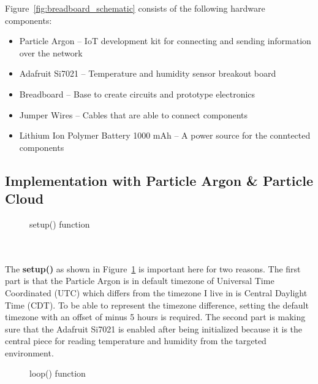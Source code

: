 \documentclass{article}
\begin{document}
Figure~\ref{fig:breadboard_schematic} consists of the following hardware components:

\begin{itemize}
	\item Particle Argon -- IoT development kit for connecting and sending information over the network
	\item Adafruit Si7021 -- Temperature and humidity sensor breakout board
	\item Breadboard -- Base to create circuits and prototype electronics
	\item Jumper Wires -- Cables that are able to connect components
	\item Lithium Ion Polymer Battery 1000 mAh -- A power source for the conntected components
\end{itemize}

\newpage

\subsection{Implementation with Particle Argon \& Particle Cloud}
\begin{minipage}[c]{\textwidth}
	\begin{figure}[H]
		
		\caption{setup() function}
		\label{fig:setup}
	\end{figure}
\end{minipage}\ \\\\

The \textbf{setup()} as shown in Figure~\ref{fig:setup} is important here for two reasons. The first part is that the Particle Argon is in default timezone of Universal Time Coordinated (UTC) which differs from the timezone I live in is Central Daylight Time (CDT). To be able to represent the timezone difference, setting the default timezone with an offset of minus 5 hours is required. The second part is making sure that the Adafruit Si7021 is enabled after being initialized because it is the central piece for reading temperature and humidity from the targeted environment.

\begin{minipage}[c]{\textwidth}
	\begin{figure}[H]
		
		\caption{loop() function}
		\label{fig:loop}
	\end{figure}
\end{minipage}\ \\\\
\end{document}
